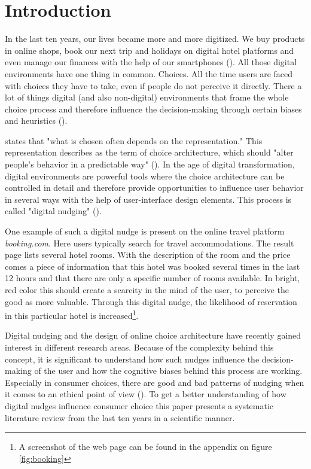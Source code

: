 \section{Introduction}
In the last ten years, our lives became more and more digitized. We buy products in online shops, book our next trip and holidays on digital hotel platforms and even manage our finances with the help of our smartphones (\cite{schneider_digital_2018}). All those digital environments have one thing in common. Choices. All the time users are faced with choices they have to take,  even if people do not perceive it directly. There a lot of things digital (and also non-digital) environments that frame the whole choice process and therefore influence the decision-making through certain biases and heuristics (\cite{tversky_judgment_1974}). 

\cite{johnson_beyond_2012} states that "what is chosen often depends on the representation." This representation describes as the term of choice architecture, which should "alter people's behavior in a predictable way" (\cite{thaler_nudge:_2009}). In the age of digital transformation, digital environments are powerful tools where the choice architecture can be controlled in detail and therefore provide opportunities to influence user behavior in several ways with the help of user-interface design elements. This process is called "digital nudging" (\cite{weinmann_digital_2016}).

One example of such a digital nudge is present on the online travel platform \textit{booking.com}. Here users typically search for travel accommodations. The result page lists several hotel rooms. With the description of the room and the price comes a piece of information that this hotel was booked several times in the last 12 hours and that there are only a specific number of rooms available. In bright, red color this should create a scarcity in the mind of the user, to perceive the good as more valuable. Through this digital nudge, the likelihood of reservation in this particular hotel is increased\footnote{A screenshot of the web page can be found in the appendix on figure \ref{fig:booking}}.

Digital nudging and the design of online choice architecture have recently gained interest in different research areas. Because of the complexity behind this concept, it is significant to understand how such nudges influence the decision-making of the user and how the cognitive biases behind this process are working. Especially in consumer choices, there are good and bad patterns of nudging when it comes to an ethical point of view (\cite{sunstein_nudging_2015}). To get a better understanding of how digital nudges influence consumer choice this paper presents a systematic literature review from the last ten years in a scientific manner. 

